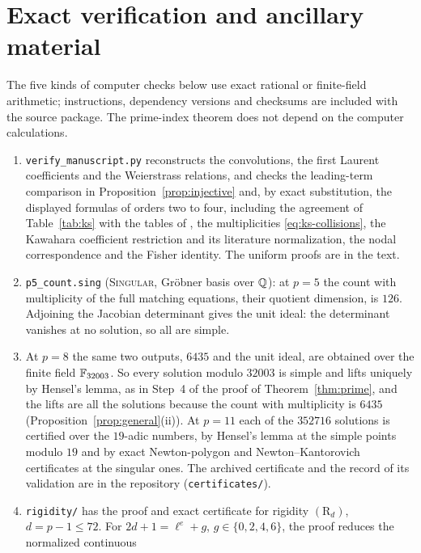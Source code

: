 \section{Exact verification and ancillary material}\label{app:verification}

The five kinds of computer checks below use exact rational or
finite-field arithmetic; instructions, dependency versions and checksums
are included with the source package. The prime-index theorem does not
depend on the computer calculations.
\begin{enumerate}\setlength{\itemsep}{0pt}\setlength{\parskip}{0pt}
\item \texttt{verify\_manuscript.py} reconstructs the convolutions, the
first Laurent coefficients and the Weierstrass relations, and checks the
leading-term comparison in Proposition~\ref{prop:injective} and, by
exact substitution, the displayed formulas of orders two to four,
including the agreement of Table~\ref{tab:ks} with the tables of
\citet{KudryashovZargaryan1996,ConteMusette2009}, the multiplicities
\eqref{eq:ks-collisions}, the Kawahara coefficient restriction and its
literature normalization, the nodal correspondence and the Fisher
identity. The uniform proofs are in the text.
\item \texttt{p5\_count.sing} (\textsc{Singular}, Gr\"obner basis over
\(\mathbb Q\)): at \(p=5\) the count with multiplicity of the full matching
equations, their quotient dimension, is \(126\). Adjoining the Jacobian
determinant gives the unit ideal: the determinant vanishes at no
solution, so all are simple.
\item At \(p=8\) the same two outputs, \(6435\) and the unit ideal, are
obtained over the finite field \(\mathbb F_{32003}\). So every solution modulo
\(32003\) is simple and lifts uniquely by Hensel's lemma, as in Step~4
of the proof of Theorem~\ref{thm:prime}, and the lifts are all the
solutions because the count with multiplicity is \(6435\)
(Proposition~\ref{prop:general}(ii)). At \(p=11\) each of the \(352716\)
solutions is certified over the \(19\)-adic numbers, by Hensel's lemma
at the simple points modulo \(19\) and by exact Newton-polygon and
Newton--Kantorovich certificates at the singular ones. The archived
certificate and the record of its validation are in the repository
(\texttt{certificates/}).
\item \texttt{rigidity/} has the proof and exact certificate for
rigidity \((\mathrm R_d)\), \(d=p-1\le72\). For \(2d+1=\ell^e+g\),
\(g\in\{0,2,4,6\}\), the proof reduces the normalized continuous

\end{enumerate}
